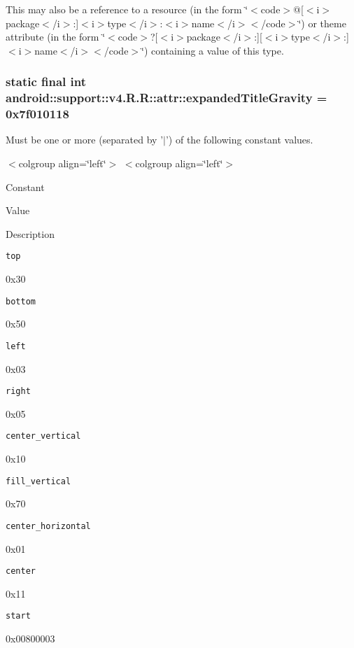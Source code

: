 This may also be a reference to a resource (in the form \char`\"{}$<$code$>$@\mbox{[}$<$i$>$package$<$/i$>$:\mbox{]}$<$i$>$type$<$/i$>$:$<$i$>$name$<$/i$>$$<$/code$>$\char`\"{}) or theme attribute (in the form \char`\"{}$<$code$>$?\mbox{[}$<$i$>$package$<$/i$>$:\mbox{]}\mbox{[}$<$i$>$type$<$/i$>$:\mbox{]}$<$i$>$name$<$/i$>$$<$/code$>$\char`\"{}) containing a value of this type. \hypertarget{classandroid_1_1support_1_1v4_1_1_r_1_1attr_f40e3acc7c6ca0d3c2c99c1aa0f4d5ca}{
\subsubsection[{expandedTitleGravity}]{\setlength{\rightskip}{0pt plus 5cm}static final int android::support::v4.R.R::attr::expandedTitleGravity = 0x7f010118}}
\label{classandroid_1_1support_1_1v4_1_1_r_1_1attr_f40e3acc7c6ca0d3c2c99c1aa0f4d5ca}


Must be one or more (separated by '$|$') of the following constant values. \begin{TabularC}{0}
\hline
\end{TabularC}
$<$colgroup align=\char`\"{}left\char`\"{}$>$ $<$colgroup align=\char`\"{}left\char`\"{}$>$ 

Constant

Value

Description 

{\tt top}

0x30

{\tt bottom}

0x50

{\tt left}

0x03

{\tt right}

0x05

{\tt center\_\-vertical}

0x10

{\tt fill\_\-vertical}

0x70

{\tt center\_\-horizontal}

0x01

{\tt center}

0x11

{\tt start}

0x00800003

